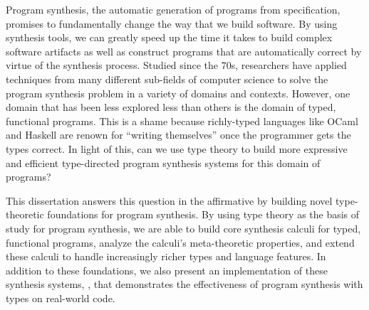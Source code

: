 Program synthesis, the automatic generation of programs from specification, promises to fundamentally change the way that we build software.
By using synthesis tools, we can greatly speed up the time it takes to build complex software artifacts as well as construct programs that are automatically correct by virtue of the synthesis process.
Studied since the 70s, researchers have applied techniques from many different sub-fields of computer science to solve the program synthesis problem in a variety of domains and contexts.
However, one domain that has been less explored less than others is the domain of typed, functional programs.
This is a shame because richly-typed languages like OCaml and Haskell are renown for ``writing themselves'' once the programmer gets the types correct.
In light of this, can we use type theory to build more expressive and efficient type-directed program synthesis systems for this domain of programs?

This dissertation answers this question in the affirmative by building novel type-theoretic foundations for program synthesis.
By using type theory as the basis of study for program synthesis, we are able to build core synthesis calculi for typed, functional programs, analyze the calculi's meta-theoretic properties, and extend these calculi to handle increasingly richer types and language features.
In addition to these foundations, we also present an implementation of these synthesis systems, \myth{}, that demonstrates the effectiveness of program synthesis with types on real-world code.
